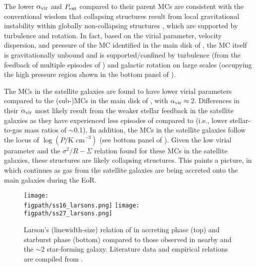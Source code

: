 \IfFileExists{emulateapjlegacy.cls}{\documentclass[iop]{emulateapjlegacy}}{\documentclass[iop]{emulateapj}}
\begin{document}
The lower $\alpha_{\rm vir}$ and $P_{\rm ext}$ compared to their parent MCs are consistent with
the conventional wisdom that collapsing structures result from local gravitational
instability within globally non-collapsing structures \citep[see e.g.,][]{Ballesteros-Paredes11a},
which are supported by turbulence and rotation. 
In fact, based on the virial parameter, velocity dispersion, and pressure of the MC identified in the main disk of \flower, 
the MC itself is gravitationally unbound and is supported/confined 
by turbulence (from the feedback of multiple episodes of \SF) 
and galactic rotation on large scales (occupying the high pressure region shown in the bottom panel of ).

The MCs in the satellite galaxies are found to have
lower virial parameters compared to the (sub-)MCs in the main disk of \flower,
with $\alpha_{\rm vir}\approx$\,2.
Differences in their $\alpha_{\rm vir}$ most likely result from the weaker
stellar feedback in the satellite galaxies as they have experienced less episodes of \SF compared to
\flower (i.e., lower stellar-to-gas mass ratios of $\sim$0.1). 
In addition, the MCs in the satellite galaxies follow the locus of 
$\log{(P/\textrm{K cm}^{-3})}$ (see bottom panel of ). 
Given the low virial parameter and the $\sigma^2/R - \Sigma$ relation found for these MCs in the satellite galaxies, 
these structures are likely collapsing structures.
This paints a picture, in which \SF continues as gas from the satellite galaxies are being accreted onto the main galaxies during the EoR.

\begin{figure*}[htbp]
\centering
\texttt{[image: \\figpath/ss16\_larsons.png]}
\texttt{[image: \\figpath/ss27\_larsons.png]}
\caption{
Larson's (linewidth-size) relation of \flower in
accreting phase (top) and
starburst phase (bottom) compared to
those observed in nearby and the \z$\sim$2 star-forming galaxy.
Literature data and empirical relations are compiled from \citet{Larson81a, Heyer04a, Rosolowsky05a, Bolatto08a, Swinbank11a, Leroy15a}.
\label{fig:larsons_single}}
\end{figure*}
\end{document}
